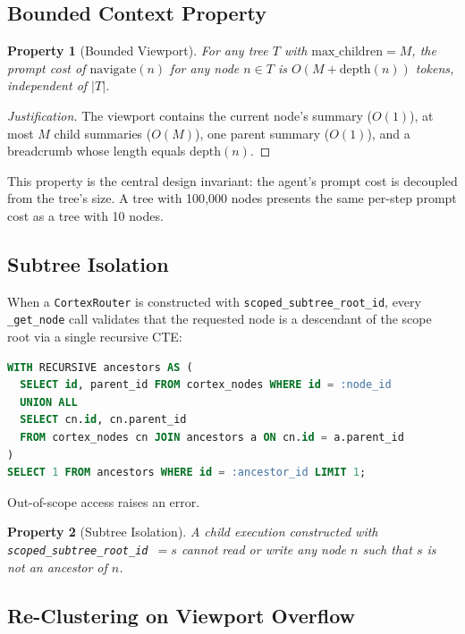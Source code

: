 \documentclass[11pt,a4paper]{article}
\theoremstyle{cortexprop}
\newtheorem{property}{Property}
\newcommand{\code}[1]{\texttt{#1}}
\begin{document}
\subsection{Bounded Context Property}
\label{sec:bounded}

\begin{property}[Bounded Viewport]
For any tree $T$ with $\text{max\_children} = M$, the prompt cost of
$\text{navigate}(n)$ for any node $n \in T$ is $O(M + \text{depth}(n))$
tokens, independent of $|T|$.
\end{property}

\begin{proof}[Justification]
The viewport contains the current node's summary ($O(1)$), at most $M$
child summaries ($O(M)$), one parent summary ($O(1)$), and a breadcrumb
whose length equals $\text{depth}(n)$.
\end{proof}

This property is the central design invariant: the agent's prompt cost is
decoupled from the tree's size. A tree with 100{,}000 nodes presents the
same per-step prompt cost as a tree with 10 nodes.

\subsection{Subtree Isolation}
\label{sec:isolation}

When a \code{CortexRouter} is constructed with
\code{scoped\_subtree\_root\_id}, every \code{\_get\_node} call validates
that the requested node is a descendant of the scope root via a single
recursive CTE:

\begin{lstlisting}[language=SQL]
WITH RECURSIVE ancestors AS (
  SELECT id, parent_id FROM cortex_nodes WHERE id = :node_id
  UNION ALL
  SELECT cn.id, cn.parent_id
  FROM cortex_nodes cn JOIN ancestors a ON cn.id = a.parent_id
)
SELECT 1 FROM ancestors WHERE id = :ancestor_id LIMIT 1;
\end{lstlisting}

Out-of-scope access raises an error.

\begin{property}[Subtree Isolation]
A child execution constructed with \code{scoped\_subtree\_root\_id}~$=s$
cannot read or write any node $n$ such that $s$ is not an ancestor of
$n$.
\end{property}

\subsection{Re-Clustering on Viewport Overflow}
\end{document}
